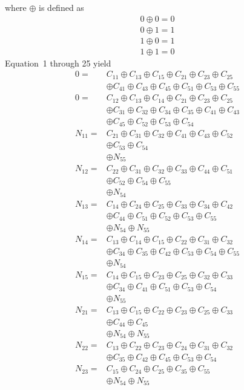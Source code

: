 \documentclass[12pt,letterpaper]{article}
\begin{document}
where $\oplus$ is defined as
\begin{align}
0\oplus 0 = 0\\
0\oplus 1 = 1\\
1\oplus 0 = 1\\
1\oplus 1 = 0
\end{align}
Equation~1 through 25 yield
\begin{align}
0 = & C_{11} \oplus C_{13} \oplus C_{15} \oplus C_{21} \oplus C_{23} \oplus C_{25} \\\nonumber
& \oplus C_{41} \oplus C_{43} \oplus C_{45} \oplus C_{51} \oplus C_{53} \oplus C_{55}\\
0 = & C_{12} \oplus C_{13} \oplus C_{14} \oplus C_{21} \oplus C_{23} \oplus C_{25} \\\nonumber
& \oplus C_{31} \oplus C_{32} \oplus C_{34} \oplus C_{35} \oplus C_{41} \oplus C_{43} \\\nonumber
& \oplus C_{45} \oplus C_{52} \oplus C_{53} \oplus C_{54}\\
N_{11} = & C_{21} \oplus C_{31} \oplus C_{32} \oplus C_{41} \oplus C_{43} \oplus C_{52} \\\nonumber
& \oplus C_{53} \oplus C_{54} \\\nonumber
& \oplus N_{55}\\
N_{12} = & C_{22} \oplus C_{31} \oplus C_{32} \oplus C_{33} \oplus C_{44} \oplus C_{51} \\\nonumber
& \oplus C_{52} \oplus C_{54} \oplus C_{55} \\\nonumber
& \oplus N_{54}\\
N_{13} = & C_{14} \oplus C_{24} \oplus C_{25} \oplus C_{33} \oplus C_{34} \oplus C_{42} \\\nonumber
& \oplus C_{44} \oplus C_{51} \oplus C_{52} \oplus C_{53} \oplus C_{55} \\\nonumber
& \oplus N_{54} \oplus N_{55}\\
N_{14} = & C_{13} \oplus C_{14} \oplus C_{15} \oplus C_{22} \oplus C_{31} \oplus C_{32} \\\nonumber
& \oplus C_{34} \oplus C_{35} \oplus C_{42} \oplus C_{53} \oplus C_{54} \oplus C_{55} \\\nonumber
& \oplus N_{54}\\
N_{15} = & C_{14} \oplus C_{15} \oplus C_{23} \oplus C_{25} \oplus C_{32} \oplus C_{33} \\\nonumber
& \oplus C_{34} \oplus C_{41} \oplus C_{51} \oplus C_{53} \oplus C_{54} \\\nonumber
& \oplus N_{55}\\
N_{21} = & C_{13} \oplus C_{15} \oplus C_{22} \oplus C_{23} \oplus C_{25} \oplus C_{33} \\\nonumber
& \oplus C_{44} \oplus C_{45} \\\nonumber
& \oplus N_{54} \oplus N_{55}\\
N_{22} = & C_{13} \oplus C_{22} \oplus C_{23} \oplus C_{24} \oplus C_{31} \oplus C_{32} \\\nonumber
& \oplus C_{35} \oplus C_{42} \oplus C_{45} \oplus C_{53} \oplus C_{54}\\
N_{23} = & C_{15} \oplus C_{24} \oplus C_{25} \oplus C_{35} \oplus C_{55} \\\nonumber
& \oplus N_{54} \oplus N_{55}
\end{align}
\end{document}
